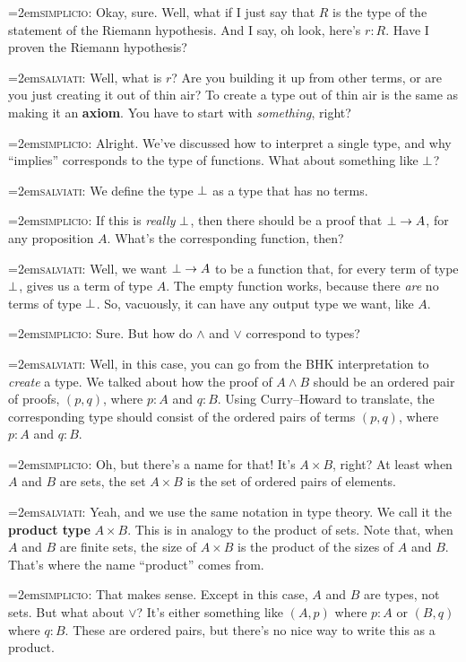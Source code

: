 \documentclass[11pt,paper=letter]{scrartcl}
\renewcommand{\land}{\wedge}
\renewcommand{\lor}{\vee}
\newcommand{\simp}{\vspace{0.5em}\noindent\hangindent=2em\textsc{simplicio:} }
\newcommand{\salv}{\vspace{0.5em}\noindent\hangindent=2em\textsc{salviati:} }
\begin{document}
\simp Okay, sure. Well, what if I just say that $R$ is the type of the statement of the Riemann hypothesis. And I say, oh look, here's $r : R$. Have I proven the Riemann hypothesis?

\salv Well, what is $r$? Are you building it up from other terms, or are you just creating it out of thin air? To create a type out of thin air is the same as making it an \textbf{axiom}. You have to start with \emph{something}, right?

\simp Alright. We've discussed how to interpret a single type, and why ``implies'' corresponds to the type of functions. What about something like $\bot$?

\salv We define the type $\bot$ as a type that has no terms.

\simp If this is \emph{really} $\bot$, then there should be a proof that $\bot \to A$, for any proposition $A$. What's the corresponding function, then?

\salv Well, we want $\bot \to A$ to be a function that, for every term of type $\bot$, gives us a term of type $A$. The empty function works, because there \emph{are} no terms of type $\bot$. So, vacuously, it can have any output type we want, like $A$.

\simp Sure. But how do $\land$ and $\lor$ correspond to types?

\salv Well, in this case, you can go from the BHK interpretation to \emph{create} a type. We talked about how the proof of $A \land B$ should be an ordered pair of proofs, $(p, q)$, where $p : A$ and $q : B$. Using Curry--Howard to translate, the corresponding type should consist of the ordered pairs of terms $(p, q)$, where $p : A$ and $q : B$.

\simp Oh, but there's a name for that! It's $A \times B$, right? At least when $A$ and $B$ are sets, the set $A \times B$ is the set of ordered pairs of elements.

\salv Yeah, and we use the same notation in type theory. We call it the \textbf{product type} $A \times B$. This is in analogy to the product of sets. Note that, when $A$ and $B$ are finite sets, the size of $A \times B$ is the product of the sizes of $A$ and $B$. That's where the name ``product'' comes from.

\simp That makes sense. Except in this case, $A$ and $B$ are types, not sets. But what about $\lor$? It's either something like $(A, p)$ where $p : A$ or $(B, q)$ where $q : B$. These are ordered pairs, but there's no nice way to write this as a product.
\end{document}
